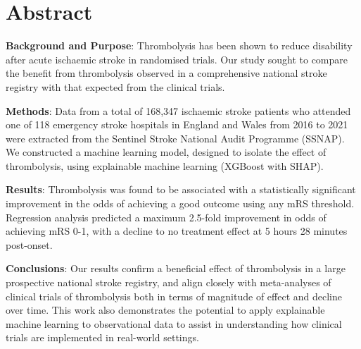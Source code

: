 \section*{Abstract}

\textbf{Background and Purpose}: Thrombolysis has been shown to reduce disability after acute ischaemic stroke in randomised trials. Our study sought to compare the benefit from thrombolysis observed in a comprehensive national stroke registry with that expected from the clinical trials.

\textbf{Methods}: Data from a total of 168,347 ischaemic stroke patients who attended one of 118 emergency stroke hospitals in England and Wales from 2016 to 2021 were extracted from the Sentinel Stroke National Audit Programme (SSNAP). We constructed a machine learning model, designed to isolate the effect of thrombolysis, using explainable machine learning (XGBoost with SHAP).

\textbf{Results}: Thrombolysis was found to be associated with a statistically significant improvement in the odds of achieving a good outcome using any mRS threshold. Regression analysis predicted a maximum 2.5-fold improvement in odds of achieving mRS 0-1, with a decline to no treatment effect at 5 hours 28 minutes post-onset.

\textbf{Conclusions}:  Our results confirm a beneficial effect of thrombolysis in a large prospective national stroke registry, and align closely with meta-analyses of clinical trials of thrombolysis both in terms of magnitude of effect and decline over time. This work also demonstrates the potential to apply explainable machine learning to observational data to assist in understanding how clinical trials are implemented in real-world settings.
